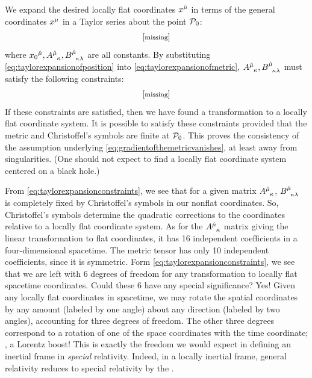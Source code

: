 We expand the desired locally flat coordinates $\tvec\pos{\ridx\mu}$ in terms of the general coordinates $\tvec\pos\mu$ in a Taylor series about the point $\mathcal{P}_0$:
%
\begin{equation}\label{eq:taylorexpansionofposition}
  \eqtxt{missing}
\end{equation}
%
where $\tvec{{\pos_0}}{\ridx\mu},\tensor{A}{^{\ridx\mu}_\kappa},\tensor{B}{^{\ridx\mu}_\kappa_\lambda}$ are all constants. By substituting \cref{eq:taylorexpansionofposition} into \cref{eq:taylorexpansionofmetric}, $\tensor{A}{^{\ridx\mu}_\kappa},\tensor{B}{^{\ridx\mu}_\kappa_\lambda}$ must satisfy the following constraints:
%
\begin{equation}\label{eq:taylorexpansionconstraints}
  \eqtxt{missing}
\end{equation}
%
If these constraints are satisfied, then we have found a transformation to a locally flat coordinate system. It is possible to satisfy these constraints provided that the metric and Christoffel's symbols are finite at $\mathcal{P}_0$. This proves the consistency of the assumption underlying \cref{eq:gradientofthemetricvanishes}, at least away from singularities. (One should not expect to find a locally flat coordinate system centered on a black hole.)

From \cref{eq:taylorexpansionconstraints}, we see that for a given matrix $\tensor{A}{^{\ridx\mu}_\kappa}$, $\tensor{B}{^{\ridx\mu}_\kappa_\lambda}$ is completely fixed by Christoffel's symbols in our nonflat coordinates. So, Christoffel's symbols determine the quadratic corrections to the coordinates relative to a locally flat coordinate system. As for the $\tensor{A}{^{\ridx\mu}_\kappa}$ matrix giving the linear transformation to flat coordinates, it has 16 independent coefficients in a four-dimensional spacetime. The metric tensor has only 10 independent coefficients, since it is symmetric. Form \cref{eq:taylorexpansionconstraints}, we see that we are left with 6 degrees of freedom for any transformation to locally flat spacetime coordinates. Could these 6 have any special significance? Yes! Given any locally flat coordinates in spacetime, we may rotate the spatial coordinates by any amount (labeled by one angle) about any direction (labeled by two angles), accounting for three degrees of freedom. The other three degrees correspond to a rotation of one of the space coordinates with the time coordinate; \ie, a Lorentz boost! This is exactly the freedom we would expect in defining an inertial frame in \emph{special} relativity. Indeed, in a locally inertial frame, general relativity reduces to special relativity by the .


